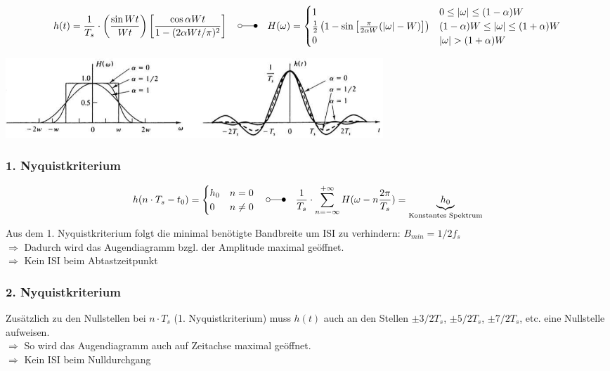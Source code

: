 \[h(t) = \frac{1}{T_s} \cdot \left( \frac{\sin{W t}}{W t} \right) \left[ \frac{\cos{\alpha W t}}{1
- (2 \alpha W t / \pi)^2}\right]
\quad \laplace \quad
H(\omega) = \begin{cases}
	1 			
		&  	0 \leq | \omega | \leq (1-\alpha) W       \\
	\frac{1}{2} \left( 1 - \sin\left[ \frac{\pi}{2 \alpha W} (| \omega | - W)\right] \right)      
		&	(1-\alpha) W \leq | \omega | \leq (1+\alpha) W       \\
	0
		& 	| \omega | > (1+\alpha) W
            \end{cases}\]


\begin{center}  
		\includegraphics[height=3cm]{bilder/dig_raisedcosinefilter.png}
\end{center}

\subsubsection{1. Nyquistkriterium}
	\[h(n\cdot T_s-t_0) = 
		\begin{cases}
			h_0 & n= 0\\
			0 & n \neq 0
		\end{cases}
		\quad \laplace \quad
		\frac{1}{T_s} \cdot \sum\limits_{n = -\infty}^{+ \infty} H(\omega - n\frac{2\pi}{T_s}) = \underbrace{h_0}_{\text{Konstantes Spektrum}}
		\]
	Aus dem 1. Nyquistkriterium folgt die minimal benötigte Bandbreite um ISI zu verhindern: $B_{min} = 1/2 f_s$\\
	$\Rightarrow$ Dadurch wird das Augendiagramm bzgl. der Amplitude maximal geöffnet. \\
	$\Rightarrow$ Kein ISI beim Abtastzeitpunkt
	
\subsubsection{2. Nyquistkriterium}
	Zusätzlich zu den Nullstellen bei $n\cdot T_s$ (1. Nyquistkriterium) muss $h(t)$ auch an den Stellen $\pm 3/2 T_s$, $\pm 5/2T_s$, $\pm 7/2 T_s$, etc. eine Nullstelle aufweisen.\\
	$\Rightarrow$ So wird das Augendiagramm auch auf Zeitachse maximal geöffnet. \\
	$\Rightarrow$ Kein ISI beim Nulldurchgang

